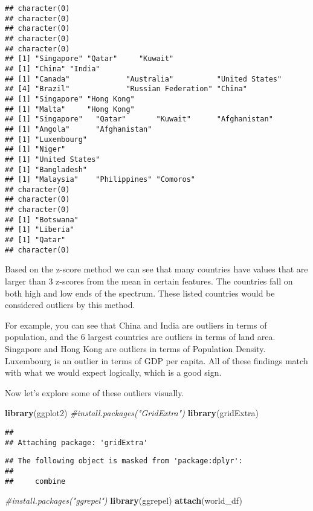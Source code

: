 \documentclass[]{article}
\newenvironment{Shaded}{\begin{snugshade}}{\end{snugshade}}
\newcommand{\CommentTok}[1]{\textcolor[rgb]{0.56,0.35,0.01}{\textit{#1}}}
\newcommand{\KeywordTok}[1]{\textcolor[rgb]{0.13,0.29,0.53}{\textbf{#1}}}
\newcommand{\NormalTok}[1]{#1}
\begin{document}
\begin{verbatim}
## character(0)
## character(0)
## character(0)
## character(0)
## character(0)
## [1] "Singapore" "Qatar"     "Kuwait"   
## [1] "China" "India"
## [1] "Canada"             "Australia"          "United States"     
## [4] "Brazil"             "Russian Federation" "China"             
## [1] "Singapore" "Hong Kong"
## [1] "Malta"     "Hong Kong"
## [1] "Singapore"   "Qatar"       "Kuwait"      "Afghanistan"
## [1] "Angola"      "Afghanistan"
## [1] "Luxembourg"
## [1] "Niger"
## [1] "United States"
## [1] "Bangladesh"
## [1] "Malaysia"    "Philippines" "Comoros"    
## character(0)
## character(0)
## character(0)
## [1] "Botswana"
## [1] "Liberia"
## [1] "Qatar"
## character(0)
\end{verbatim}

Based on the z-score method we can see that many countries have values
that are larger than 3 z-scores from the mean in certain features. The
countries fall on both high and low ends of the spectrum. These listed
countries would be considered outliers by this method.

For example, you can see that China and India are outliers in terms of
population, and the 6 largest countries are outliers in terms of land
area. Singapore and Hong Kong are outliers in terms of Population
Density. Luxembourg is an outlier in terms of GDP per capita. All of
these findings match with what we would expect logically, which is a
good sign.

Now let's explore some of these outliers visually.

\begin{Shaded}
\begin{Highlighting}[]
\KeywordTok{library}\NormalTok{(ggplot2)}
\CommentTok{#install.packages("GridExtra")}
\KeywordTok{library}\NormalTok{(gridExtra)}
\end{Highlighting}
\end{Shaded}

\begin{verbatim}
## 
## Attaching package: 'gridExtra'
\end{verbatim}

\begin{verbatim}
## The following object is masked from 'package:dplyr':
## 
##     combine
\end{verbatim}

\begin{Shaded}
\begin{Highlighting}[]
\CommentTok{#install.packages("ggrepel")}
\KeywordTok{library}\NormalTok{(ggrepel)}
\KeywordTok{attach}\NormalTok{(world_df)}
\end{Highlighting}
\end{Shaded}
\end{document}
